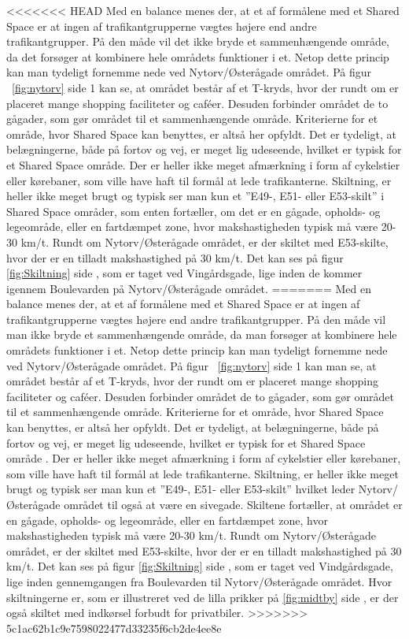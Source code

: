 <<<<<<< HEAD
Med en balance menes der, at et af formålene med et Shared Space er at ingen af trafikantgrupperne vægtes højere end andre trafikantgrupper. På den måde vil det ikke bryde et sammenhængende område, da det forsøger at kombinere hele områdets funktioner i et. Netop dette princip kan man tydeligt fornemme nede ved Nytorv/Østerågade området.  På figur ~\cref{fig:nytorv} side \pageref*{fig:nytorv} 1 kan se, at området består af et T-kryds, hvor der rundt om er placeret mange shopping faciliteter og caféer. Desuden forbinder området de to gågader, som gør området til et sammenhængende område. Kriterierne for et område, hvor Shared Space kan benyttes, er altså her opfyldt.
Det er tydeligt, at belægningerne, både på fortov og vej, er meget lig udeseende, hvilket er typisk for et Shared Space område. Der er heller ikke meget afmærkning i form af cykelstier eller kørebaner, som ville have haft til formål at lede trafikanterne. Skiltning, er heller ikke meget brugt og typisk ser man kun et ”E49-, E51- eller E53-skilt” i Shared Space områder, som enten fortæller, om det er en gågade, opholds- og legeområde, eller en fartdæmpet zone, hvor makshastigheden typisk må være 20-30 km/t.  Rundt om Nytorv/Østerågade området, er der skiltet med E53-skilte, hvor der er en tilladt makshastighed på 30 km/t. Det kan ses på figur \cref{fig:Skiltning} side \pageref{fig:Skiltning}, som er taget ved Vingårdsgade, lige inden de kommer igennem Boulevarden på Nytorv/Østerågade området.
=======
Med en balance menes der, at et af formålene med et Shared Space er at ingen af trafikantgrupperne vægtes højere end andre trafikantgrupper. På den måde vil man ikke bryde et sammenhængende område, da man forsøger at kombinere hele områdets funktioner i et. Netop dette princip kan man tydeligt fornemme nede ved Nytorv/Østerågade området.  På figur ~\cref{fig:nytorv} side \pageref*{fig:nytorv} 1 kan man se, at området består af et T-kryds, hvor der rundt om er placeret mange shopping faciliteter og caféer. Desuden forbinder området de to gågader, som gør området til et sammenhængende område. Kriterierne for et område, hvor Shared Space kan benyttes, er altså her opfyldt.
Det er tydeligt, at belægningerne, både på fortov og vej, er meget lig udeseende, hvilket er typisk for et Shared Space område \autocite{reglershared}. Der er heller ikke meget afmærkning i form af cykelstier eller kørebaner, som ville have haft til formål at lede trafikanterne. Skiltning, er heller ikke meget brugt og typisk ser man kun et ”E49-, E51- eller E53-skilt” hvilket leder Nytorv/Østerågade området til også at være en sivegade. Skiltene fortæller, at området er en gågade, opholds- og legeområde, eller en fartdæmpet zone, hvor makshastigheden typisk må være 20-30 km/t.  Rundt om Nytorv/Østerågade området, er der skiltet med E53-skilte, hvor der er en tilladt makshastighed på 30 km/t. Det kan ses på figur \cref{fig:Skiltning} side \pageref{fig:Skiltning}, som er taget ved Vindgårdsgade, lige inden gennemgangen fra Boulevarden til Nytorv/Østerågade området. Hvor skiltningerne er, som er illustreret ved de lilla prikker på \cref{fig:midtby} side \pageref{fig:midtby}, er der også skiltet med indkørsel forbudt for privatbiler. 
>>>>>>> 5c1ac62b1c9e7598022477d33235f6cb2de4ee8e

